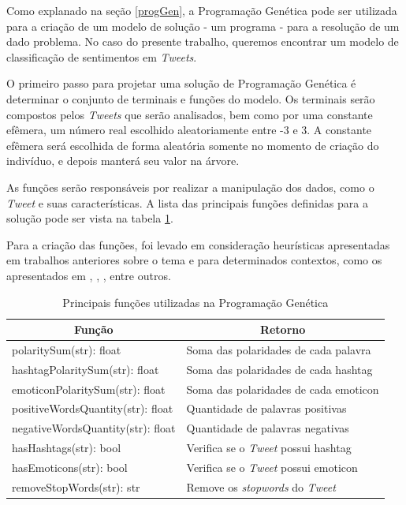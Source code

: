\documentclass[12pt]{article}
\begin{document}
Como explanado na seção \ref{progGen}, a Programação Genética pode ser utilizada para a criação de um modelo de solução - um programa - para a resolução de um dado problema. No caso do presente trabalho, queremos encontrar um modelo de classificação de sentimentos em \emph{Tweets}.

O primeiro passo para projetar uma solução de Programação Genética é determinar o conjunto de terminais e funções do modelo. Os terminais serão compostos pelos \emph{Tweets} que serão analisados, bem como por uma constante efêmera, um número real escolhido aleatoriamente entre -3 e 3. A constante efêmera será escolhida de forma aleatória somente no momento de criação do indivíduo, e depois manterá seu valor na árvore.

As funções serão responsáveis por realizar a manipulação dos dados, como o \emph{Tweet} e suas características. A lista das principais funções definidas para a solução pode ser vista na tabela \ref{tab_functions}.


Para a criação das funções, foi levado em consideração heurísticas apresentadas em trabalhos anteriores sobre o tema e para determinados contextos, como os apresentados em \cite{araujo2013metodos}, \cite{Rodrigues2016}, \cite{Turney2002}, entre outros.

\begin{table}[H]
	\centering
	\begin{tabular}{ll}
	\multicolumn{1}{c}{\textbf{Função}} & \multicolumn{1}{c}{\textbf{Retorno}} \\
	\hline
	polaritySum(str): float & Soma das polaridades de cada palavra  \\
	\hline
	hashtagPolaritySum(str): float & Soma das polaridades de cada hashtag \\
	\hline
	emoticonPolaritySum(str): float & Soma das polaridades de cada emoticon  \\
	\hline
	positiveWordsQuantity(str): float & Quantidade de palavras positivas \\
	\hline
	negativeWordsQuantity(str): float & Quantidade de palavras negativas \\
	\hline
	hasHashtags(str): bool & Verifica se o \emph{Tweet} possui hashtag \\
	\hline
	hasEmoticons(str): bool & Verifica se o \emph{Tweet} possui emoticon \\
	\hline
	removeStopWords(str): str & Remove os \emph{stopwords} do \emph{Tweet} \\
	\hline
	\end{tabular}
	\caption{Principais funções utilizadas na Programação Genética}
	\label{tab_functions}
\end{table}
\end{document}
